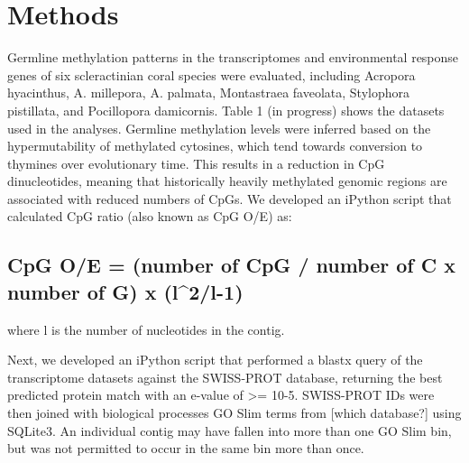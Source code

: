 \section{Methods}


Germline methylation patterns in the transcriptomes and environmental response genes of six scleractinian coral species were evaluated, including Acropora hyacinthus, A. millepora, A. palmata, Montastraea faveolata, Stylophora pistillata, and Pocillopora damicornis. Table 1 (in progress) shows the datasets used in the analyses. Germline methylation levels were inferred based on the hypermutability of methylated cytosines, which tend towards conversion to thymines over evolutionary time. This results in a reduction in CpG dinucleotides, meaning that historically heavily methylated genomic regions are associated with reduced numbers of CpGs. We developed an iPython script that calculated CpG ratio (also known as CpG O/E) as:

\subsection{CpG O/E = (number of CpG / number of C x number of G) x (l^2/l-1)}



where l is the number of nucleotides in the contig.

Next, we developed an iPython script that performed a blastx query of the transcriptome datasets against the SWISS-PROT database, returning the best predicted protein match with an e-value of >= 10-5. SWISS-PROT IDs were then joined with biological processes GO Slim terms from [which database?] using SQLite3. An individual contig may have fallen into more than one GO Slim bin, but was not permitted to occur in the same bin more than once.
